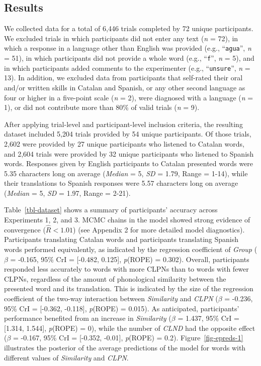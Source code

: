 \documentclass[
]{article}
\begin{document}
\subsection{Results}\label{results}

We collected data for a total of 6,446 trials completed by 72 unique
participants. We excluded trials in which participants did not enter any
text (\emph{n} = 72), in which a response in a language other than
English was provided (e.g., ``\texttt{agua}'', \emph{n} = 51), in which
participants did not provide a whole word (e.g., ``\texttt{f}'',
\emph{n} = 5), and in which participants added comments to the
experimenter (e.g., ``\texttt{unsure}'', \emph{n} = 13). In addition, we
excluded data from participants that self-rated their oral and/or
written skills in Catalan and Spanish, or any other second language as
four or higher in a five-point scale (\emph{n} = 2), were diagnosed with
a language (\emph{n} = 1), or did not contribute more than 80\% of valid
trials (\emph{n} = 9).

After applying trial-level and participant-level inclusion criteria, the
resulting dataset included 5,204 trials provided by 54 unique
participants. Of those trials, 2,602 were provided by 27 unique
participants who listened to Catalan words, and 2,604 trials were
provided by 32 unique participants who listened to Spanish words.
Responses given by English participants to Catalan presented words were
5.35 characters long on average (\emph{Median} = 5, \emph{SD} = 1.79,
Range = 1-14), while their translations to Spanish responses were 5.57
characters long on average (\emph{Median} = 5, \emph{SD} = 1.97, Range =
2-21).

Table~\ref{tbl-dataset} shows a summary of participants' accuracy across
Experiments 1, 2, and 3. MCMC chains in the model showed strong evidence
of convergence (\(\hat{R}<1.01\)) (see Appendix 2 for more detailed
model diagnostics). Participants translating Catalan words and
participants translating Spanish words performed equivalently, as
indicated by the regression coefficient of \emph{Group} (\(\beta\) =
-0.165, 95\% CrI = {[}-0.482, 0.125{]}, \emph{p}(ROPE) = 0.302).
Overall, participants responded less accurately to words with more CLPNs
than to words with fewer CLPNs, regardless of the amount of phonological
similarity between the presented word and its translation. This is
indicated by the size of the regression coefficient of the two-way
interaction between \emph{Similarity} and \emph{CLPN} (\(\beta\) =
-0.236, 95\% CrI = {[}-0.362, -0.118{]}, \emph{p}(ROPE) = 0.015). As
anticipated, participants' performance benefited from an increase in
\emph{Similarity} (\(\beta\) = 1.437, 95\% CrI = {[}1.314, 1.544{]},
\emph{p}(ROPE) = 0), while the number of \emph{CLND} had the opposite
effect (\(\beta\) = -0.167, 95\% CrI = {[}-0.352, -0.01{]},
\emph{p}(ROPE) = 0.2). Figure~\ref{fig-epreds-1} illustrates the
posterior of the average predictions of the model for words with
different values of \emph{Similarity} and \emph{CLPN}.
\end{document}
